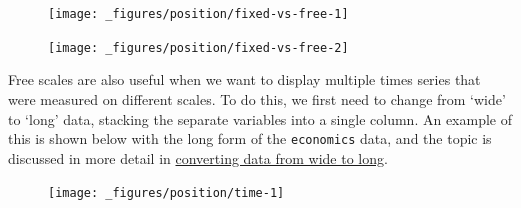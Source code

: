 \begin{figure}[H]
  \centering
  \texttt{[image: \_figures/position/fixed-vs-free-1]}%
\end{figure}

\begin{Shaded}
\begin{Highlighting}[]
\StringTok{ } \NormalTok{)}
\end{Highlighting}
\end{Shaded}

\begin{figure}[H]
  \centering
  \texttt{[image: \_figures/position/fixed-vs-free-2]}
\end{figure}

Free scales are also useful when we want to display multiple times
series that were measured on different scales. To do this, we first need
to change from `wide' to `long' data, stacking the separate variables
into a single column. An example of this is shown below with the long
form of the \texttt{economics} data, and the topic is discussed in more
detail in \hyperref[sec:spread-gather]{converting data from wide to
long}. 

\begin{Shaded}
\begin{Highlighting}[]
\CommentTok{#> }
\StringTok{ }
\StringTok{  }\NormalTok{() +}\StringTok{ }
\StringTok{  } \NormalTok{, } \NormalTok{)}
\end{Highlighting}
\end{Shaded}

\begin{figure}[H]
  \centering
  \texttt{[image: \_figures/position/time-1]}
\end{figure}

